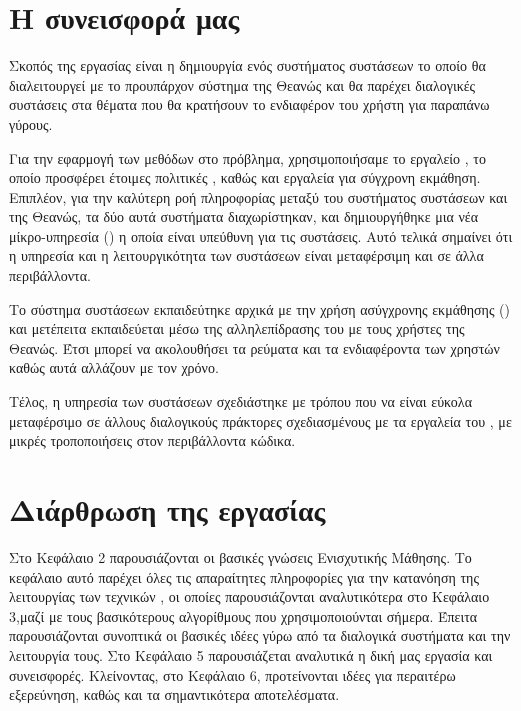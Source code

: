 \section{Η συνεισφορά μας}

Σκοπός της εργασίας είναι η δημιουργία ενός συστήματος συστάσεων το οποίο θα διαλειτουργεί με το προυπάρχον σύστημα της Θεανώς και θα παρέχει διαλογικές συστάσεις στα θέματα που θα κρατήσουν το ενδιαφέρον του χρήστη για παραπάνω γύρους.

Για την εφαρμογή των μεθόδων  στο πρόβλημα, χρησιμοποιήσαμε το εργαλείο , το οποίο προσφέρει έτοιμες πολιτικές , καθώς και εργαλεία για σύγχρονη εκμάθηση. Επιπλέον, για την καλύτερη ροή πληροφορίας μεταξύ του συστήματος συστάσεων και της Θεανώς, τα δύο αυτά συστήματα διαχωρίστηκαν, και δημιουργήθηκε μια νέα μίκρο-υπηρεσία () η οποία είναι υπεύθυνη για τις συστάσεις. Αυτό τελικά σημαίνει ότι η υπηρεσία και η λειτουργικότητα των συστάσεων είναι μεταφέρσιμη και σε άλλα περιβάλλοντα.

Το σύστημα συστάσεων εκπαιδεύτηκε αρχικά με την χρήση ασύγχρονης εκμάθησης () και μετέπειτα εκπαιδεύεται μέσω της αλληλεπίδρασης του με τους χρήστες της Θεανώς. Έτσι μπορεί να ακολουθήσει τα ρεύματα και τα ενδιαφέροντα των χρηστών καθώς αυτά αλλάζουν με τον χρόνο.

Τέλος, η υπηρεσία των συστάσεων σχεδιάστηκε με τρόπου που να είναι εύκολα μεταφέρσιμο σε άλλους διαλογικούς πράκτορες σχεδιασμένους με τα εργαλεία του , με μικρές τροποποιήσεις στον περιβάλλοντα κώδικα.

\section{Διάρθρωση της εργασίας}

Στο Κεφάλαιο 2 παρουσιάζονται οι βασικές γνώσεις Ενισχυτικής Μάθησης. Το κεφάλαιο αυτό παρέχει όλες τις απαραίτητες πληροφορίες για την κατανόηση της λειτουργίας των τεχνικών , οι οποίες παρουσιάζονται αναλυτικότερα στο Κεφάλαιο 3,μαζί με τους βασικότερους αλγορίθμους που χρησιμοποιούνται σήμερα. Έπειτα παρουσιάζονται συνοπτικά οι βασικές ιδέες γύρω από τα διαλογικά συστήματα και την λειτουργία τους. Στο Κεφάλαιο 5 παρουσιάζεται αναλυτικά η δική μας εργασία και συνεισφορές. Κλείνοντας, στο Κεφάλαιο 6, προτείνονται ιδέες για περαιτέρω εξερεύνηση, καθώς και τα σημαντικότερα αποτελέσματα. 
